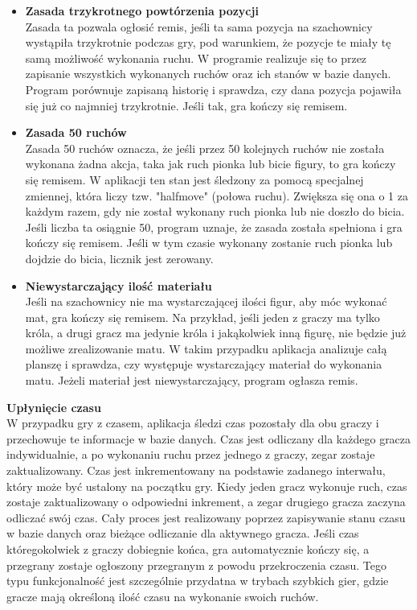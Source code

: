 \documentclass[12pt,a4paper]{article}
\begin{document}
\begin{itemize}
    \item \textbf{Zasada trzykrotnego powtórzenia pozycji}\\
    Zasada ta pozwala ogłosić remis, jeśli ta sama pozycja na szachownicy wystąpiła trzykrotnie podczas gry, pod warunkiem, że pozycje te miały tę samą możliwość wykonania ruchu. W programie realizuje się to przez zapisanie wszystkich wykonanych ruchów oraz ich stanów w bazie danych. Program porównuje zapisaną historię i sprawdza, czy dana pozycja pojawiła się już co najmniej trzykrotnie. Jeśli tak, gra kończy się remisem.

    \item \textbf{Zasada 50 ruchów}\\
    Zasada 50 ruchów oznacza, że jeśli przez 50 kolejnych ruchów nie została wykonana żadna akcja, taka jak ruch pionka lub bicie figury, to gra kończy się remisem. W aplikacji ten stan jest śledzony za pomocą specjalnej zmiennej, która liczy tzw. "halfmove" (połowa ruchu). Zwiększa się ona o 1 za każdym razem, gdy nie został wykonany ruch pionka lub nie doszło do bicia. Jeśli liczba ta osiągnie 50, program uznaje, że zasada została spełniona i gra kończy się remisem. Jeśli w tym czasie wykonany zostanie ruch pionka lub dojdzie do bicia, licznik jest zerowany.

    \item \textbf{Niewystarczający ilość materiału}\\
    Jeśli na szachownicy nie ma wystarczającej ilości figur, aby móc wykonać mat, gra kończy się remisem. Na przykład, jeśli jeden z graczy ma tylko króla, a drugi gracz ma jedynie króla i jakąkolwiek inną figurę, nie będzie już możliwe zrealizowanie matu. W takim przypadku aplikacja analizuje całą planszę i sprawdza, czy występuje wystarczający materiał do wykonania matu. Jeżeli materiał jest niewystarczający, program ogłasza remis.

\end{itemize}

\noindent \textbf{Upłynięcie czasu}\\
W przypadku gry z czasem, aplikacja śledzi czas pozostały dla obu graczy i przechowuje te informacje w bazie danych. Czas jest odliczany dla każdego gracza indywidualnie, a po wykonaniu ruchu przez jednego z graczy, zegar zostaje zaktualizowany. Czas jest inkrementowany na podstawie zadanego interwału, który może być ustalony na początku gry. Kiedy jeden gracz wykonuje ruch, czas zostaje zaktualizowany o odpowiedni inkrement, a zegar drugiego gracza zaczyna odliczać swój czas. Cały proces jest realizowany poprzez zapisywanie stanu czasu w bazie danych oraz bieżące odliczanie dla aktywnego gracza. Jeśli czas któregokolwiek z graczy dobiegnie końca, gra automatycznie kończy się, a przegrany zostaje ogłoszony przegranym z powodu przekroczenia czasu. Tego typu funkcjonalność jest szczególnie przydatna w trybach szybkich gier, gdzie gracze mają określoną ilość czasu na wykonanie swoich ruchów.
\end{document}
